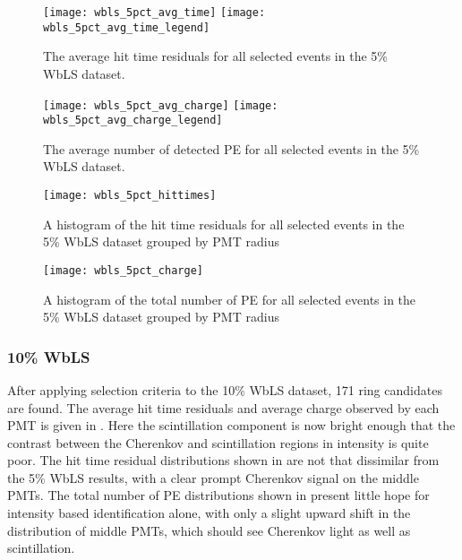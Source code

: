 \begin{figure}
\centering
\texttt{[image: wbls\_5pct\_avg\_time]}
\texttt{[image: wbls\_5pct\_avg\_time\_legend]}
\caption{\label{fig:wbls5pct_avg_time}The average hit time residuals for all selected events in the 5\% WbLS dataset.}
\end{figure}

\begin{figure}
\centering
\texttt{[image: wbls\_5pct\_avg\_charge]}
\texttt{[image: wbls\_5pct\_avg\_charge\_legend]}
\caption{\label{fig:wbls5pct_avg_charge}The average number of detected PE for all selected events in the 5\% WbLS dataset.}
\end{figure}

\begin{figure}
\centering
\texttt{[image: wbls\_5pct\_hittimes]}
\caption{\label{fig:wbls5pct_tresid}A histogram of the hit time residuals for all selected events in the 5\% WbLS dataset grouped by PMT radius}
\end{figure}

\begin{figure}
\centering
\texttt{[image: wbls\_5pct\_charge]}
\caption{\label{fig:wbls5pct_totalq}A histogram of the total number of PE for all selected events in the 5\% WbLS dataset grouped by PMT radius}
\end{figure}

\clearpage

\subsubsection{10\% WbLS}

After applying selection criteria to the 10\% WbLS dataset, 171 ring candidates are found.
The average hit time residuals and average charge observed by each PMT is given in .
Here the scintillation component is now bright enough that the contrast between the Cherenkov and scintillation regions in intensity is quite poor.
The hit time residual distributions shown in  are not that dissimilar from the 5\% WbLS results, with a clear prompt Cherenkov signal on the middle PMTs.
The total number of PE distributions shown in  present little hope for intensity based identification alone, with only a slight upward shift in the distribution of middle PMTs, which should see Cherenkov light as well as scintillation.

